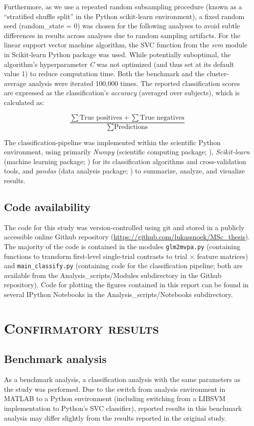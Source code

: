 \documentclass[jou,12pt,a4paper]{apa6}
\begin{document}
Furthermore, as we use a repeated random subsampling procedure (known as a ``stratified shuffle split'' in the Python scikit-learn environment), a fixed random seed (random\_state = 0) was chosen for the following analyses to avoid subtle differences in results across analyses due to random sampling artifacts. For the linear support vector machine algorithm, the SVC function from the \emph{svm} module in Scikit-learn Python package was used. While potentially suboptimal, the algorithm's hyperparameter \emph{C} was not optimized (and thus set at its default value 1) to reduce computation time. Both the benchmark and the cluster-average analysis were iterated 100,000 times. The reported classification scores are expressed as the classification's \emph{accuracy} (averaged over subjects), which is calculated as:

\[\frac{\sum\text{True positives}+\sum\text{True negatives}}{\sum\text{Predictions}}\]

The classification-pipeline was implemented within the scientific Python environment, using primarily \emph{Numpy} (scientific computing package; ), \emph{Scikit-learn} (machine learning package; ) for its classification algorithms and cross-validation tools, and \emph{pandas} (data analysis package; ) to summarize, analyze, and visualize results.

\subsection{Code availability}
\noindent The code for this study was version-controlled using git and stored in a publicly accessible online Github repository (\url{https://github.com/lukassnoek/MSc_thesis}). The majority of the code is contained in the modules \texttt{glm2mvpa.py} (containing functions to transform first-level single-trial contrasts to trial $\times$ feature matrices) and \texttt{main\_classify.py} (containing code for the classification pipeline; both are available from the Analysis\_scripts/Modules subdirectory in the Github repository). Code for plotting the figures contained in this report can be found in several IPython Notebooks in the Analysis\_scripts/Notebooks subdirectory. 

\section{\Large \textsc{Confirmatory results}}

\subsection{Benchmark analysis}
\noindent As a benchmark analysis, a classification analysis with the same parameters as the  study was performed. Due to the switch from analysis environment in MATLAB to a Python environment (including switching from a LIBSVM implementation to Python's SVC classifier), reported results in this benchmark analysis may differ slightly from the results reported in the original study. 
\end{document}
